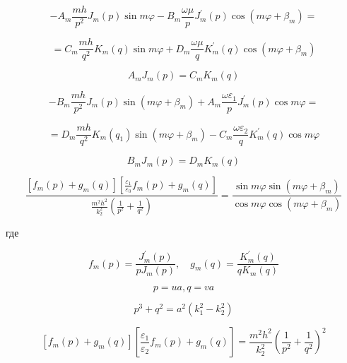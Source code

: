 $$-A_{m} \frac{m h}{p^{2}} J_{m}(p) \sin m \varphi-B_{m} \frac{\omega \mu}{p} J_{m}^{\prime}(p) \cos \left(m \varphi+\beta_{m}\right)=$$

$$=C_{m} \frac{m h}{q^{2}} K_{m}(q) \sin m \varphi+D_{m} \frac{\omega \mu}{q} K_{m}^{\prime}(q) \cos \left(m \varphi+\beta_{m}\right)$$

$$A_{m} J_{m}(p)=C_{m} K_{m}(q)$$

$$-B_{m} \frac{m h}{p^{2}} J_{m}(p) \sin \left(m \varphi+\beta_{m}\right)+A_{m} \frac{\omega \varepsilon_{1}}{p} J_{m}^{\prime}(p) \cos m \varphi=$$

$$=D_{m} \frac{m h}{q^{2}} K_{m}\left(q_{1}\right) \sin \left(m \varphi+\beta_{m}\right)-C_{m} \frac{\omega \varepsilon_{2}}{q} K_{m}^{\prime}(q) \cos m \varphi$$

$$B_{m} J_{m}(p)=D_{m} K_{m}(q)$$

$$\frac{\left[f_{m}(p)+g_{m}(q)\right]\left[\frac{\varepsilon_{1}}{\varepsilon_{0}} f_{m}(p)+g_{m}(q)\right]}{\frac{m^{2} h^{2}}{k_{2}^{2}}\left(\frac{1}{p^{2}}+\frac{1}{q^{2}}\right)}
=\frac{\sin m \varphi \sin \left(m \varphi+\beta_{m}\right)}{\cos m \varphi \cos \left(m \varphi+\beta_{m}\right)}$$


где

$$f_{m}(p)=\frac{J_{m}^{\prime}(p)}{p J_{m}(p)}, \quad g_{m}(q)=\frac{K_{m}^{\prime}(q)}{q K_{m}(q)}$$

$$p=u a, q=v a$$

$$p^{3}+q^{2}=a^{2}\left(k_{1}^{2}-k_{2}^{2}\right)$$

$$\left[f_{m}(p)+g_{m}(q)\right]\left[\frac{\varepsilon_{1}}{\varepsilon_{2}} f_{m}(p)+g_{m}(q)\right]=\frac{m^{2} h^{2}}{k_{2}^{2}}\left(\frac{1}{p^{2}}+\frac{1}{q^{2}}\right)^{2}$$